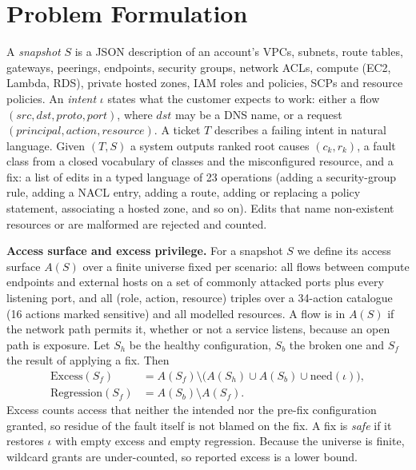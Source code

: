 \documentclass[conference]{IEEEtran}
\begin{document}
\section{Problem Formulation}\label{sec:problem}
A \emph{snapshot} $S$ is a JSON description of an account's VPCs, subnets, route tables, gateways, peerings, endpoints,
security groups, network ACLs, compute (EC2, Lambda, RDS), private hosted zones, IAM roles and policies, SCPs and resource
policies. An \emph{intent} $\iota$ states what the customer expects to work: either a flow
$(\mathit{src}, \mathit{dst}, \mathit{proto}, \mathit{port})$, where $\mathit{dst}$ may be a DNS name, or a request
$(\mathit{principal}, \mathit{action}, \mathit{resource})$. A ticket $T$ describes a failing intent in natural language.
Given $(T, S)$ a system outputs ranked root causes $(c_k, r_k)$, a fault class from a closed vocabulary of \NClasses{} classes and
the misconfigured resource, and a fix: a list of edits in a typed language of 23 operations (adding a security-group rule,
adding a NACL entry, adding a route, adding or replacing a policy statement, associating a hosted zone, and so on). Edits
that name non-existent resources or are malformed are rejected and counted.

\textbf{Access surface and excess privilege.} For a snapshot $S$ we define its access surface $A(S)$ over a finite universe
fixed per scenario: all flows between compute endpoints and external hosts on a set of commonly attacked ports plus every
listening port, and all (role, action, resource) triples over a 34-action catalogue (16 actions marked sensitive) and all
modelled resources. A flow is in $A(S)$ if the network path permits it, whether or not a service listens, because an open
path is exposure. Let $S_h$ be the healthy configuration, $S_b$ the broken one and $S_f$ the result of applying a fix. Then
\begin{align}
\mathrm{Excess}(S_f) &= A(S_f) \setminus \big(A(S_h) \cup A(S_b) \cup \mathrm{need}(\iota)\big),\\
\mathrm{Regression}(S_f) &= A(S_b) \setminus A(S_f).
\end{align}
Excess counts access that neither the intended nor the pre-fix configuration granted, so residue of the fault itself is not
blamed on the fix. A fix is \emph{safe} if it restores $\iota$ with empty excess and empty regression. Because the universe is
finite, wildcard grants are under-counted, so reported excess is a lower bound.
\end{document}

